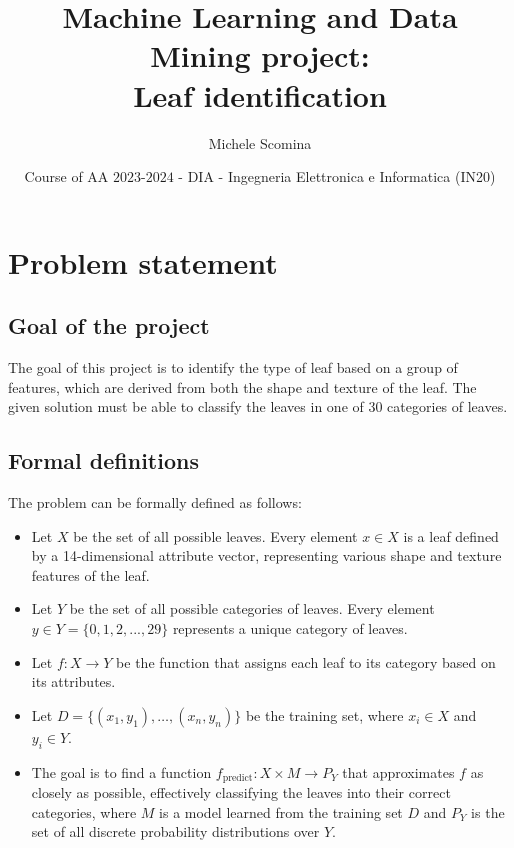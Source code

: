 \documentclass{article}
\title{Machine Learning and Data Mining project:\\Leaf identification}
\author[1]{Michele Scomina}
\affil[1]{
    problem statement,
    solution design,
    solution development,
    data gathering,
    writing
}
\date{Course of AA $2023$-$2024$ - DIA - Ingegneria Elettronica e Informatica (IN20)}
\begin{document}
\maketitle



\section{Problem statement}
\subsection{Goal of the project}
The goal of this project is to identify the type of leaf based on a group of features, which are derived from both the shape and texture of the leaf.
The given solution must be able to classify the leaves in one of 30 categories of leaves.

\subsection{Formal definitions}
The problem can be formally defined as follows:
\begin{itemize}
    \item Let $X$ be the set of all possible leaves. Every element $x \in X$ is a leaf defined by a 14-dimensional attribute vector, representing various shape and texture features of the leaf.
    \item Let $Y$ be the set of all possible categories of leaves. Every element $y \in Y = \{0, 1, 2, ..., 29\}$ represents a unique category of leaves.
    \item Let $f: X \to Y$ be the function that assigns each leaf to its category based on its attributes.
    \item Let $D = \{(x_1, y_1), \ldots, (x_n, y_n)\}$ be the training set, where $x_i \in X$ and $y_i \in Y$.
    \item The goal is to find a function $f_{\text{predict}}: X \times M \to P_{Y}$ that approximates $f$ as closely as possible, effectively classifying the leaves into their correct categories, where $M$ is a model learned from the training set $D$ and $P_{Y}$ is the set of all discrete probability distributions over $Y$.
\end{itemize}
\end{document}
